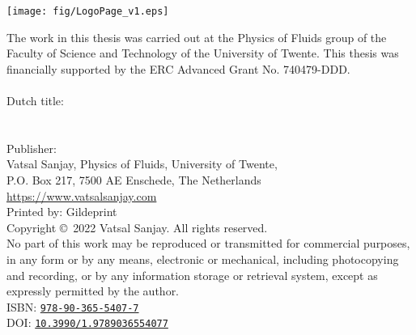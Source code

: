 {\centering\texttt{[image: fig/LogoPage\_v1.eps]}}

\vspace{2.5mm}

\noindent The work in this thesis was carried out at the Physics of Fluids group of the Faculty of Science and Technology of the University of Twente. This thesis was financially supported by the ERC Advanced Grant No. 740479-DDD.\\
\vspace{2mm}\\
\noindent Dutch title: \\
\noindent\emph{\thesistitledutch}\\
\vspace{2mm}\\
\noindent Publisher:\\
Vatsal Sanjay, Physics of Fluids, University of Twente,\\
P.O. Box 217, 7500 AE Enschede, The Netherlands\\
\url{https://www.vatsalsanjay.com}\\
Printed by: Gildeprint
\vspace{2mm}\\
\noindent Copyright \copyright~2022 Vatsal Sanjay. All rights reserved.\\

\noindent No part of this work may be reproduced or transmitted for commercial purposes, in any form or by any means, electronic or mechanical, including photocopying and recording, or by any information storage or retrieval system, except as expressly permitted by the author.\\

\noindent ISBN: \href{https://doi.org/10.3990/1.9789036554077}{\texttt{978-90-365-5407-7}}\\
\noindent DOI: \href{https://doi.org/10.3990/1.9789036554077}{\texttt{10.3990/1.9789036554077}}

